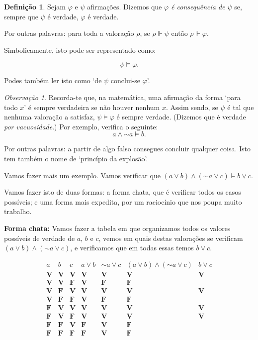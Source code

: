 \documentclass{article}
\theoremstyle{definition}
\newtheorem{definicao}{Definição}
\theoremstyle{remark}
\newtheorem{obs}{Observação}
\newcommand{\V}{\mathbf{V}}
\newcommand{\F}{\mathbf{F}}
\newcommand*{\lneg}{\mathord{\sim}}
\begin{document}
	\begin{definicao}
	Sejam $\varphi$ e $\psi$ afirmações. Dizemos que \emph{$\varphi$ é consequência de $\psi$} se, sempre que $\psi$ é verdade, $\varphi$ é verdade.
	
	Por outras palavras: para toda a valoração $\rho$, se $\rho \Vdash \psi$ então $\rho \Vdash \varphi$.
	
	Simbolicamente, isto pode ser representado como:
	
	\[\psi \vDash \varphi.\]
	
	Podes também ler isto como `de $\psi$ conclui-se $\varphi$'.
	\end{definicao}
	
	\begin{obs}
	Recorda-te que, na matemática, uma afirmação da forma `para todo $x$' é sempre verdadeira se não houver nenhum $x$. Assim sendo, se $\psi$ é tal que nenhuma valoração a satisfaz, $\psi \vDash \varphi$ é sempre verdade. (Dizemos que é verdade \emph{por vacuosidade}.) Por exemplo, verifica o seguinte:
	\[ a \land \lneg a \vDash b.\]
	
	Por outras palavras: a partir de algo falso consegues concluir qualquer coisa. Isto tem também o nome de `princípio da explosão'.
	\end{obs}
	
	Vamos fazer mais um exemplo. Vamos verificar que $(a \lor b) \land (\lneg a \lor c) \vDash b \lor c$.
	
	Vamos fazer isto de duas formas: a forma chata, que é verificar todos os casos possíveis; e uma forma mais expedita, por um raciocínio que nos poupa muito trabalho.
	
	\textbf{Forma chata:} Vamos fazer a tabela em que organizamos todos os valores possíveis de verdade de $a$, $b$ e $c$, vemos em quais destas valorações se verificam $(a \lor b) \land (\lneg a \lor c)$, e verificamos que em todas essas temos $b \lor c$.
	
	\[
	\begin{array}{c|c|c|c|c|c|c}
	a&b&c&a\lor b&\lneg a \lor c&(a \lor b) \land (\lneg a \lor c)& b \lor c\\
	\hline
	\V&\V&\V&\V&\V&\V&\V\\
	\V&\V&\F&\V&\F&\F&\\
	\V&\F&\V&\V&\V&\V&\V\\
	\V&\F&\F&\V&\F&\F&\\
	\F&\V&\V&\V&\V&\V&\V\\
	\F&\V&\F&\V&\V&\V&\V\\
	\F&\F&\V&\F&\V&\F&\\
	\F&\F&\F&\F&\V&\F&
	\end{array}
	\]
	
\end{document}
